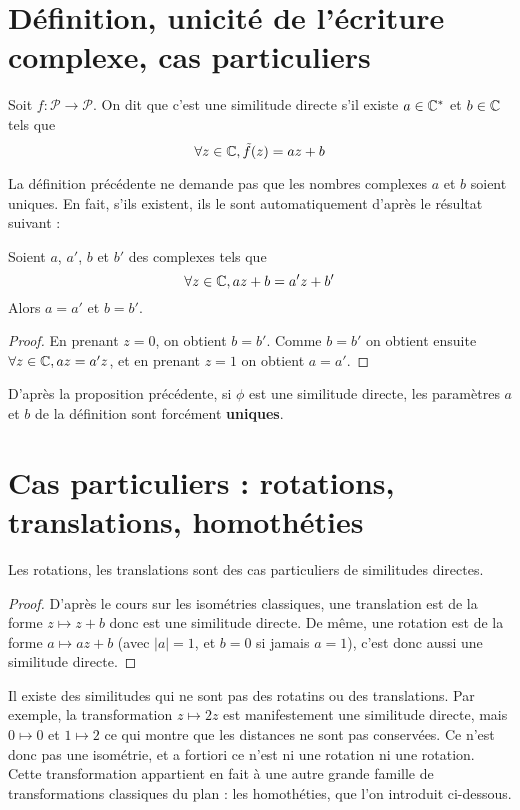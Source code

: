 
\section{Définition, unicité de l'écriture complexe, cas particuliers}


\begin{definition}
Soit $f : \mathcal P\to \mathcal P$. On dit que c'est une similitude directe s'il existe $a\in\mathbb{C}^*$ et $b\in\mathbb{C}$ tels que
\[ \forall z\in\mathbb{C}, \tilde f(z)=az+b\]
\end{definition}


La définition précédente ne demande pas que les nombres complexes $a$ et $b$ soient uniques. En fait, s'ils existent, ils le sont automatiquement d'après le résultat suivant :

\begin{proposition}
Soient $a$, $a'$, $b$ et $b'$ des complexes tels que
\[ \forall z\in\mathbb{C}, az+b=a'z+b'\]
Alors $a=a'$ et $b=b'$.
\end{proposition}
\begin{proof}
En prenant $z=0$, on obtient $b=b'$. Comme $b=b'$ on obtient ensuite $\forall z\in\mathbb{C}, az=a'z$, et en prenant $z=1$ on obtient $a=a'$. 
\end{proof}

\begin{remarque}
D'après la proposition précédente, si $\phi$ est une similitude directe, les paramètres $a$ et $b$ de la définition sont forcément \textbf{uniques}.
\end{remarque}

\section{Cas particuliers : rotations, translations, homothéties}

\begin{proposition}
Les rotations, les translations sont des cas particuliers de similitudes directes.
\end{proposition}
\begin{proof}
D'après le cours sur les isométries classiques, une translation est de la forme $z\mapsto z+b$ donc est une similitude directe. De même, une rotation est de la forme $a\mapsto az+b$ (avec $|a|=1$, et $b=0$ si jamais $a=1$), c'est donc aussi une similitude directe.
\end{proof}


Il existe des similitudes qui ne sont pas des rotatins ou des translations. Par exemple, la transformation $z\mapsto 2z$ est manifestement une similitude directe, mais $0\mapsto 0$ et $1\mapsto 2$ ce qui montre que les distances ne sont pas conservées. Ce n'est donc pas une isométrie, et a fortiori ce n'est ni une rotation ni une rotation. Cette transformation appartient en fait à une autre grande famille de transformations classiques du plan : les homothéties, que l'on introduit ci-dessous.

